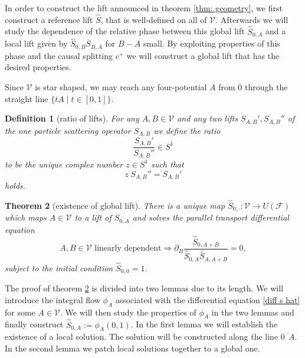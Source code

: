 \documentclass[b5paper,draft,openbib,12pt]{memoir}
\newtheorem{Def}{Definition}
\newtheorem{Thm}[Def]{Theorem}
\begin{document}
In order to construct the lift announced in theorem \ref{thm: geometry}, we first construct a reference lift \(\hat{S}\), that is well-defined on all of \(\mathcal{V}\). 
Afterwards we will study the dependence of the relative phase between 
this global lift \(\hat{S}_{0,A}\) and a local lift given by \(\hat{S}_{0,B}\overline{S}_{B,A}\) for \(B-A\) small. 
By exploiting properties of this phase and the causal splitting \(c^+\) we will construct a global lift that has the desired properties.

Since \(\mathcal{V}\) is star shaped, we may reach any four-potential \(A\) from \(0\) through the straight line
\(\{t A\mid t \in [0,1]\}\). 

\begin{Def}[ratio of lifts]\label{def:ratio}
For any  \(A,B\in\mathcal{V}\) and any two lifts \(S_{A,B}', S_{A,B}''\) of the one particle scattering operator \(S_{A,B}\)
we define the ratio
\begin{equation}
\frac{S_{A,B}'}{S_{A,B}''}\in S^1
\end{equation}
to be the unique complex number \(z\in S^1\) such that 
\begin{equation}
z ~S_{A,B}'' = S_{A,B}'
\end{equation}
holds.
\end{Def}

\begin{Thm}[existence of global lift]\label{thm: ex s hat}
  There is a unique map \(\hat{S}_{0,\cdot}:\mathcal{V}\to U(\mathcal{F})\) 
    which maps  \(A\in\mathcal{V}\) to a lift of \(S_{0,A}\) and solves the 
    parallel transport differential equation
\begin{equation}\label{diff s hat}
A,B\in\mathcal{V}\text{ linearly dependent}\Rightarrow \partial_B \frac{\hat{S}_{0,A+B}}{\hat{S}_{0,A}\overline{S}_{A,A+B}}=0,
\end{equation}
subject to the initial condition \(\hat{S}_{0,0}=1\).
\end{Thm}

The proof of theorem \ref{thm: ex s hat} is divided into two lemmas due to its length. We will introduce the integral flow \(\phi_A\) associated 
with the differential equation \eqref{diff s hat} for some \(A\in\mathcal{V}\). We will then study the properties of \(\phi_A\)
in the two lemmas and finally construct \(\hat{S}_{0,A}:=\phi_A(0,1)\). In the first lemma we will establish the existence of a 
local solution. The solution will be constructed along the line \(\overline{0 ~~ A}\). In the second lemma we patch local solutions together
to a global one.
\end{document}
